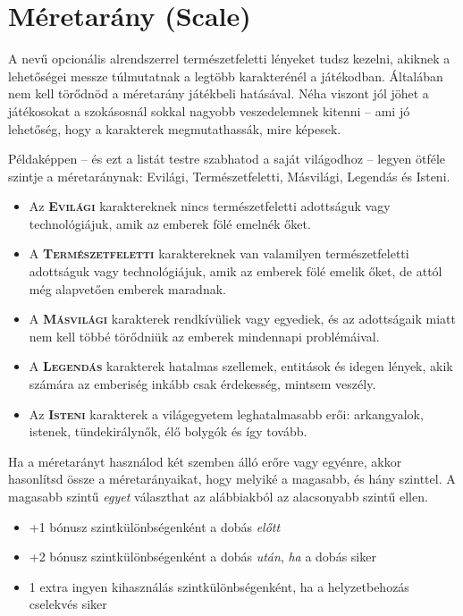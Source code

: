 \section[Méretarány]{Méretarány (Scale)}

A  nevű opcionális alrendszerrel természetfeletti lényeket tudsz kezelni, akiknek a lehetőségei messze túlmutatnak a legtöbb karakterénél a játékodban. Általában nem kell törődnöd a méretarány játékbeli hatásával. Néha viszont jól jöhet a játékosokat a szokásosnál sokkal nagyobb veszedelemnek kitenni -- ami jó lehetőség, hogy a karakterek megmutathassák, mire képesek.

Példaképpen -- és ezt a listát testre szabhatod a saját világodhoz -- legyen ötféle szintje a méretaránynak: Evilági, Természetfeletti, Másvilági, Legendás és Isteni.

\begin{itemize}
    \item Az \textsc{\textbf{Evilági}} karaktereknek nincs természetfeletti adottságuk vagy technológiájuk, amik az emberek fölé emelnék őket.
    \item A \textsc{\textbf{Természetfeletti}} karaktereknek van valamilyen természetfeletti adottságuk vagy technológiájuk, amik az emberek fölé emelik őket, de attól még alapvetően emberek maradnak.
    \item A \textsc{\textbf{Másvilági}} karakterek rendkívüliek vagy egyediek, és az adottságaik miatt nem kell többé törődniük az emberek mindennapi problémáival.
    \item A \textsc{\textbf{Legendás}} karakterek hatalmas szellemek, entitások és idegen lények, akik számára az emberiség inkább csak érdekesség, mintsem veszély.
    \item Az \textsc{\textbf{Isteni}} karakterek a világegyetem leghatalmasabb erői: arkangyalok, istenek, tündekirálynők, élő bolygók és így tovább.
\end{itemize}

Ha a méretarányt használod két szemben álló erőre vagy egyénre, akkor hasonlítsd össze a méretarányaikat, hogy melyiké a magasabb, és hány szinttel. A magasabb szintű \emph{egyet} választhat az alábbiakból az alacsonyabb szintű ellen.

\begin{itemize}
    \item +1 bónusz szintkülönbségenként a dobás \emph{előtt}
    \item +2 bónusz szintkülönbségenként a dobás \emph{után}, \emph{ha} a dobás siker
    \item 1 extra ingyen kihasználás szintkülönbségenként, ha a helyzetbehozás cselekvés siker
\end{itemize}

